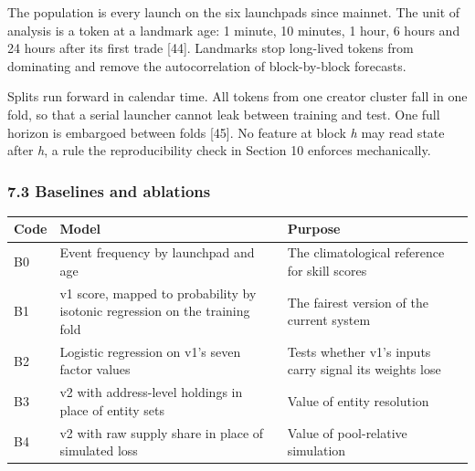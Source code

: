 The population is every launch on the six launchpads since mainnet. The unit of analysis is a token at a landmark age: 1 minute, 10 minutes, 1 hour, 6 hours and 24 hours after its first trade {[}44{]}. Landmarks stop long-lived tokens from dominating and remove the autocorrelation of block-by-block forecasts.

Splits run forward in calendar time. All tokens from one creator cluster fall in one fold, so that a serial launcher cannot leak between training and test. One full horizon is embargoed between folds {[}45{]}. No feature at block \emph{h} may read state after \emph{h}, a rule the reproducibility check in Section 10 enforces mechanically.

\subsubsection{7.3 Baselines and ablations}\label{baselines-and-ablations}

{\def\LTcaptype{none} %
\begin{longtable}[]{@{}
  >{\raggedright\arraybackslash}p{}
  >{\raggedright\arraybackslash}p{}
  >{\raggedright\arraybackslash}p{}@{}}
\toprule\noalign{}
\begin{minipage}[b]{\linewidth}\raggedright
Code
\end{minipage} & \begin{minipage}[b]{\linewidth}\raggedright
Model
\end{minipage} & \begin{minipage}[b]{\linewidth}\raggedright
Purpose
\end{minipage} \\
\midrule\noalign{}
\endhead
\bottomrule\noalign{}
\endlastfoot
B0 & Event frequency by launchpad and age & The climatological reference for skill scores \\
B1 & v1 score, mapped to probability by isotonic regression on the training fold & The fairest version of the current system \\
B2 & Logistic regression on v1's seven factor values & Tests whether v1's inputs carry signal its weights lose \\
B3 & v2 with address-level holdings in place of entity sets & Value of entity resolution \\
B4 & v2 with raw supply share in place of simulated loss & Value of pool-relative simulation \\
\end{longtable}
}

